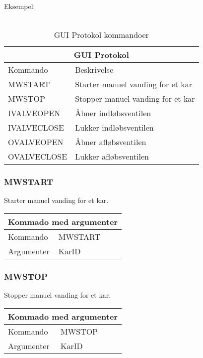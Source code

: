 Eksempel:\\
\\

\begin{table}[H]
\setlength{\parindent}{12pt}
\begin{tabular}{|l|l|}\hline
\multicolumn{2}{|c|}{GUI Protokol\cellcolor[gray]{0.7}}\\\hline
Kommando & Beskrivelse \\\hline
MWSTART 		& Starter manuel vanding for et kar \\\hline 
MWSTOP  		& Stopper manuel vanding for et kar \\\hline 
IVALVEOPEN 		& Åbner indløbsventilen \\\hline 
IVALVECLOSE		& Lukker indløbsventilen \\\hline 
OVALVEOPEN 		& Åbner afløbsventilen \\\hline 
OVALVECLOSE		& Lukker afløbsventilen \\\hline 
\end{tabular}
\label{tab:GUIProtokol}
\caption{GUI Protokol kommandoer}
\end{table}


\subsubsection{MWSTART}
Starter manuel vanding for et kar.

\begin{table}[H]
\setlength{\parindent}{12pt}
\begin{tabular}{|l|lcc|}
\hline
\multicolumn{4}{|c|}{Kommado med argumenter}\\\hline
Kommando & MWSTART & & \\
Argumenter & KarID & & \\\hline
\end{tabular}
\end{table}


\subsubsection{MWSTOP}
Stopper manuel vanding for et kar.

\begin{table}[H]
\setlength{\parindent}{12pt}
\begin{tabular}{|l|lcc|}
\hline
\multicolumn{4}{|c|}{Kommado med argumenter}\\\hline
Kommando & MWSTOP & & \\
Argumenter & KarID & & \\\hline
\end{tabular}
\end{table}


